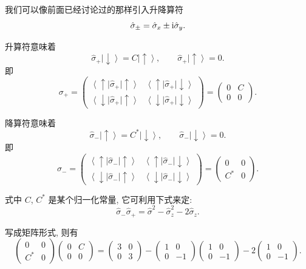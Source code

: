 我们可以像前面已经讨论过的那样引入升降算符
\[
\hat{\sigma}_{\pm}
=
\hat{\sigma}_x\pm \mathop{}\!\mathrm{i}\hat{\sigma}_y .
\]

升算符意味着
\[
\hat{\sigma}_+\left|\downarrow\right\rangle
=
C\left|\uparrow\right\rangle,
\qquad
\hat{\sigma}_+\left|\uparrow\right\rangle
=
0 .
\]
即
\[
\sigma_+
=
\begin{pmatrix}
\left\langle\uparrow\right|\hat{\sigma}_+\left|\uparrow\right\rangle
&
\left\langle\uparrow\right|\hat{\sigma}_+\left|\downarrow\right\rangle
\\
\left\langle\downarrow\right|\hat{\sigma}_+\left|\uparrow\right\rangle
&
\left\langle\downarrow\right|\hat{\sigma}_+\left|\downarrow\right\rangle
\end{pmatrix}
=
\begin{pmatrix}
0 & C\\
0 & 0
\end{pmatrix}.
\]

降算符意味着
\[
\hat{\sigma}_-\left|\uparrow\right\rangle
=
C^*\left|\downarrow\right\rangle,
\qquad
\hat{\sigma}_-\left|\downarrow\right\rangle
=
0 .
\]
即
\[
\sigma_-
=
\begin{pmatrix}
\left\langle\uparrow\right|\hat{\sigma}_-\left|\uparrow\right\rangle
&
\left\langle\uparrow\right|\hat{\sigma}_-\left|\downarrow\right\rangle
\\
\left\langle\downarrow\right|\hat{\sigma}_-\left|\uparrow\right\rangle
&
\left\langle\downarrow\right|\hat{\sigma}_-\left|\downarrow\right\rangle
\end{pmatrix}
=
\begin{pmatrix}
0 & 0\\
C^* & 0
\end{pmatrix}.
\]

式中 $C$, $C^*$ 是某个归一化常量, 它可利用下式来定:
\[
\hat{\sigma}_-\hat{\sigma}_+
=
\hat{\sigma}^2-\hat{\sigma}_z^2-2\hat{\sigma}_z .
\]

写成矩阵形式, 则有
\[
\begin{pmatrix}
0 & 0\\
C^* & 0
\end{pmatrix}
\begin{pmatrix}
0 & C\\
0 & 0
\end{pmatrix}
=
\begin{pmatrix}
3 & 0\\
0 & 3
\end{pmatrix}
-
\begin{pmatrix}
1 & 0\\
0 & -1
\end{pmatrix}
\begin{pmatrix}
1 & 0\\
0 & -1
\end{pmatrix}
-
2
\begin{pmatrix}
1 & 0\\
0 & -1
\end{pmatrix}.
\]

